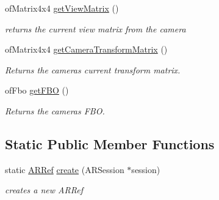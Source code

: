 \begin{DoxyCompactItemize}
\item 
of\+Matrix4x4 \hyperlink{class_a_r_processor_a2e1d4cde9029bad28ac797c94e73096a}{get\+View\+Matrix} ()
\begin{DoxyCompactList}\small\item\em returns the current view matrix from the camera \end{DoxyCompactList}\item 
of\+Matrix4x4 \hyperlink{class_a_r_processor_aea093b6d054daa0c75de6f7a492a19ff}{get\+Camera\+Transform\+Matrix} ()
\begin{DoxyCompactList}\small\item\em Returns the camera\textquotesingle{}s current transform matrix. \end{DoxyCompactList}\item 
of\+Fbo \hyperlink{class_a_r_processor_a8436dc786e91fb933879d90a4ab396d5}{get\+F\+BO} ()
\begin{DoxyCompactList}\small\item\em Returns the camera\textquotesingle{}s F\+BO. \end{DoxyCompactList}\end{DoxyCompactItemize}
\subsection*{Static Public Member Functions}
\begin{DoxyCompactItemize}
\item 
static \hyperlink{_a_r_processor_8h_aa8c5643290d0692cc71388c3f0f1623a}{A\+R\+Ref} \hyperlink{class_a_r_processor_affa1cf36e94e3015c436fd30626dd773}{create} (A\+R\+Session $\ast$session)
\begin{DoxyCompactList}\small\item\em creates a new A\+R\+Ref \end{DoxyCompactList}\end{DoxyCompactItemize}
